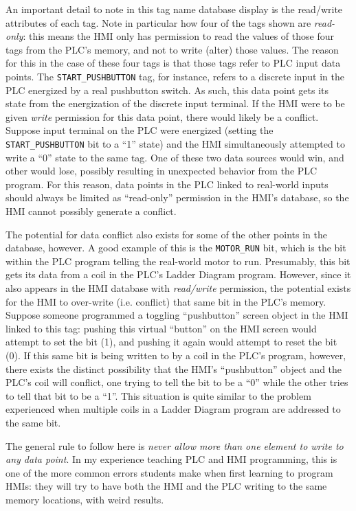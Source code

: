 \vskip 10pt

An important detail to note in this tag name database display is the read/write attributes of each tag.  Note in particular how four of the tags shown are \textit{read-only}: this means the HMI only has permission to read the values of those four tags from the PLC's memory, and not to write (alter) those values.  The reason for this in the case of these four tags is that those tags refer to PLC input data points.  The \texttt{START\_PUSHBUTTON} tag, for instance, refers to a discrete input in the PLC energized by a real pushbutton switch.  As such, this data point gets its state from the energization of the discrete input terminal.  If the HMI were to be given \textit{write} permission for this data point, there would likely be a conflict.  Suppose input terminal on the PLC were energized (setting the \texttt{START\_PUSHBUTTON} bit to a ``1'' state) and the HMI simultaneously attempted to write a ``0'' state to the same tag.  One of these two data sources would win, and other would lose, possibly resulting in unexpected behavior from the PLC program.  For this reason, data points in the PLC linked to real-world inputs should always be limited as ``read-only'' permission in the HMI's database, so the HMI cannot possibly generate a conflict.

The potential for data conflict also exists for some of the other points in the database, however.  A good example of this is the \texttt{MOTOR\_RUN} bit, which is the bit within the PLC program telling the real-world motor to run.  Presumably, this bit gets its data from a coil in the PLC's Ladder Diagram program.  However, since it also appears in the HMI database with \textit{read/write} permission, the potential exists for the HMI to over-write (i.e. conflict) that same bit in the PLC's memory.  Suppose someone programmed a toggling ``pushbutton'' screen object in the HMI linked to this tag: pushing this virtual ``button'' on the HMI screen would attempt to set the bit (1), and pushing it again would attempt to reset the bit (0).  If this same bit is being written to by a coil in the PLC's program, however, there exists the distinct possibility that the HMI's ``pushbutton'' object and the PLC's coil will conflict, one trying to tell the bit to be a ``0'' while the other tries to tell that bit to be a ``1''.  This situation is quite similar to the problem experienced when multiple coils in a Ladder Diagram program are addressed to the same bit.

The general rule to follow here is \textit{never allow more than one element to write to any data point}.  In my experience teaching PLC and HMI programming, this is one of the more common errors students make when first learning to program HMIs: they will try to have both the HMI and the PLC writing to the same memory locations, with weird results.

